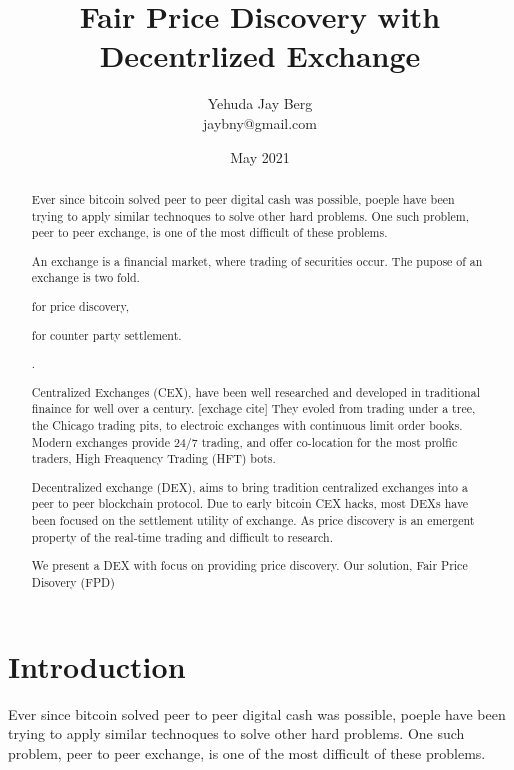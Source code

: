 \documentclass[12pt]{article}
\title{Fair Price Discovery with Decentrlized Exchange}
\author{Yehuda Jay Berg \\jaybny@gmail.com}
\date{May 2021}
\begin{document}
\parindent 0cm
\parskip   6pt
\maketitle




\begin{abstract}
    Ever since bitcoin solved peer to peer digital cash was possible, poeple have been trying to apply similar technoques to solve other hard problems. One such problem, peer to peer exchange, is one of the most difficult of these problems. 

An exchange is a financial market, where trading of securities occur. The pupose of an exchange is two fold. \begin {enumerate*} [1) ]%
\item for price discovery, \item for counter party settlement. \end {enumerate*}. 

Centralized Exchanges (CEX), have been well researched and developed in traditional finaince for well over a century. [exchage cite] They  evoled from trading under a tree, the Chicago trading pits, to electroic exchanges with continuous limit order books. Modern exchanges provide 24/7 trading, and offer co-location for the most prolfic traders, High Freaquency Trading (HFT) bots. 

Decentralized exchange (DEX), aims to bring tradition centralized exchanges into a peer to peer blockchain protocol. Due to early bitcoin CEX hacks, most DEXs have been focused on the settlement utility of exchange. As price discovery is an emergent property of the real-time trading and difficult to research. 

We present a DEX with focus on providing price discovery. Our solution, Fair Price Disovery (FPD) 

\end{abstract}

\section{Introduction}
Ever since bitcoin solved peer to peer digital cash was possible, poeple have been trying to apply similar technoques to solve other hard problems. One such problem, peer to peer exchange, is one of the most difficult of these problems. 
\end{document}
